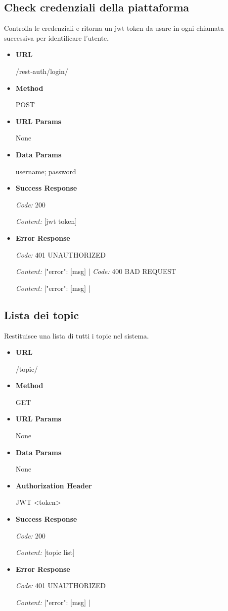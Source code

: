 \subsection{Check credenziali della piattaforma}
Controlla le credenziali e ritorna un jwt token da usare in ogni 
chiamata successiva per identificare l'utente.
\begin{itemize}
\item \textbf{URL} \par
    /rest-auth/login/
\item \textbf{Method} \par
    POST
\item \textbf{URL Params} \par
    None
\item \textbf{Data Params} \par
    username; password
\item \textbf{Success Response} \par
    \emph{Code:} 200 \par
    \emph{Content:} [jwt token]
\item \textbf{Error Response} \par
    \emph{Code:} 401 UNAUTHORIZED \par
    \emph{Content:} |{"error": [msg] }|
    \emph{Code:} 400 BAD REQUEST \par
    \emph{Content:} |{"error": [msg] }|
\end{itemize}

\subsection{Lista dei topic}
Restituisce una lista di tutti i topic nel sistema.
\begin{itemize}
\item \textbf{URL} \par
    /topic/
\item \textbf{Method} \par
    GET
\item \textbf{URL Params} \par
    None
\item \textbf{Data Params} \par
    None
\item \textbf{Authorization Header} \par
    JWT <token>
\item \textbf{Success Response} \par
    \emph{Code:} 200 \par
    \emph{Content:} [topic list]
\item \textbf{Error Response} \par
    \emph{Code:} 401 UNAUTHORIZED \par
    \emph{Content:} |{"error": [msg] }|
\end{itemize}

